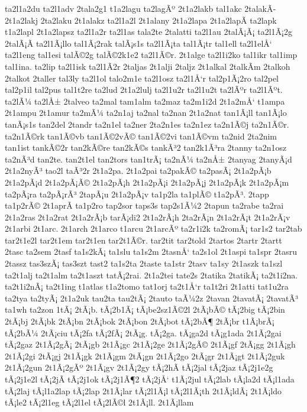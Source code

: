 {ta2l1a2du
ta2l1adv
2tala2g1
t1a2lagu
ta2lagÃº
2t1a2lakb
tal1akc
2talakÃ­
2t1a2lakj
2ta2laku
2t1alakz
ta2l1a2l
2t1alany
2t1a2lapa
2t1a2lapÃ­
ta2lapk
t1a2lapl
2t1a2lapsz
ta2l1a2r
ta2l1as
tala2te
2talatti
ta2l1au
2talÃ¡Ã¡
ta2l1Ã¡2g
2talÃ¡Ã­
ta2l1Ã¡llo
tal1Ã¡2rak
talÃ¡s1s
ta2l1Ã¡ta
tal1Ã¡tr
tal1ell
ta2l1elÅ‘
ta2l1eng
tal1esi
talÃ©2g
talÃ©2k1e2
ta2l1Ã©r.
2t1alge
ta2l1i2ko
tal1ikr
tal1imp
tal1ina.
ta2lip
ta2l1isk
ta2l1Ã­2r
2taljas
2t1alji
2taljz
2t1alkal
2talkÃ­m
2talkoh
2talkot
2taller
tal3ly
ta2l1ol
talo2m1e
ta2l1osz
ta2l1Å‘r
tal2p1Ã¡2ro
tal2pel
tal2p1il
tal2pus
tal1t2re
ta2lud
2t1a2lulj
ta2l1u2r
ta2l1u2t
ta2lÃºr
ta2l1Ãºt.
ta2lÃ¼
ta2lÅ±
2talveo
ta2mal
tam1alm
ta2maz
ta2m1i2d
2t1a2mÅ‘
t1ampa
2t1ampu
2t1amur
ta2mÃ¼
ta2n1aj
ta2nal
ta2nan
2t1a2nat
tan1Ã¡ll
tan1Ã¡lo
tanÃ¡s1s
tan2del
2tandr
ta2n1el
ta2ner
2ta2n1es
ta2n1ez
ta2n1Ã©j
ta2n1Ã©r.
ta2n1Ã©rk
tan1Ã©vb
tan1Ã©2vÃ©
tan1Ã©2vi
tan1Ã©vm
ta2nid
2ta2nim
tan1ist
tankÃ©2r
tan2kÃ©re
tan2kÃ©s
tankÃ³2
tan2k1Ã³ra
2tanny
ta2n1osz
ta2nÃ³d
tan2te.
tan2t1el
tan2tors
tan1trÃ¡
ta2nÃ¼
ta2nÅ±
2tanyag
2tanyÃ¡d
2t1a2nyÃ³
tao2l
taÃ³2r
2t1a2pa.
2t1a2pai
ta2pakÃ©
ta2pasÃ¡
2t1a2pÃ¡b
2t1a2pÃ¡d
2t1a2pÃ¡Ã©
2t1a2pÃ¡h
2t1a2pÃ¡i
2t1a2pÃ¡j
2t1a2pÃ¡k
2t1a2pÃ¡m
ta2pÃ¡ra
ta2pÃ¡rÃ³
2tapÃ¡u
2t1a2pÃ¡v
ta1p2la
ta1plÃ©
t1a2pÃ³.
2tapp
ta1p2rÃ©
2t1aprÃ­
ta1p2ro
tap2sor
taps3s
tap2s1Ã¼2
2tapun
ta2rabe
ta2rai
2t1a2ras
2t1a2rat
2t1a2rÃ¡b
tarÃ¡di2
2t1a2rÃ¡h
2ta2rÃ¡n
2t1a2rÃ¡t
2t1a2rÃ¡v
2t1arbi
2t1arc.
2t1arch
2t1arco
t1arcu
2t1arcÃº
ta2r1i2k
ta2romÃ¡
tar1s2
tar2tab
tar2t1e2l
tar2t1em
tar2t1en
tar2t1Ã©r.
tar2tit
tar2told
2tartos
2tartr
2tartt
2tasc
ta2sem
2tasf
ta1s2kÃ¡
ta1slu
ta1s2m
2tasnÅ‘
ta2s1ol
2t1aspi
ta1spr
2tasru
2tassz
tas3szÃ¡
tas3szt
tast2
ta1s2ta
2taste
ta1str
2tasv
ta1sy
2t1aszk
ta1szl
ta2t1alj
ta2t1alm
ta2t1aszt
tatÃ¡2rai.
2t1a2tei
tate2s
2tatika
2tatikÃ¡
ta2t1i2na.
ta2t1i2nÃ¡
ta2t1ing
t1atlas
t1a2tomo
tat1orj
ta2t1Å‘r
ta1t2ri
2t1atti
tat1u2ra
ta2tya
ta2tyÃ¡
2t1a2uk
tau2ta
tau2tÃ¡
2tauto
taÃ¼2z
2tavan
2tavatÃ¡
2tavatÃ³
ta1wh
ta2zon
1tÃ¡
2tÃ¡b.
tÃ¡2b1Ã¡
tÃ¡be2sz1Ã©2l
2tÃ¡bÃ©
tÃ¡2big
tÃ¡2bin
2tÃ¡bj
2tÃ¡bk
2tÃ¡bn
2tÃ¡bok
2tÃ¡bon
2tÃ¡bot
tÃ¡2bÃ¶
2tÃ¡br
t1Ã¡brÃ¡
tÃ¡2bÃ¼
2tÃ¡ciu
tÃ¡2fa
tÃ¡2fÃ¡
2tÃ¡g.
tÃ¡2ga.
tÃ¡ga2d
tÃ¡g1ada
2t1Ã¡2gai
tÃ¡2gaz
2t1Ã¡2gÃ¡
2tÃ¡gb
2t1Ã¡gc
2t1Ã¡2ge
2t1Ã¡2gÃ©
2t1Ã¡gf
2tÃ¡gg
2t1Ã¡gh
2t1Ã¡2gi
2tÃ¡gj
2t1Ã¡gk
2t1Ã¡gm
2tÃ¡gn
2t1Ã¡2go
2tÃ¡gr
2t1Ã¡gt
2t1Ã¡2guk
2t1Ã¡2gun
2t1Ã¡2gÃº
2t1Ã¡gv
2t1Ã¡2gy
tÃ¡2hÃ­
tÃ¡2jal
tÃ¡2jaz
tÃ¡2j1e2g
tÃ¡2j1e2l
tÃ¡2jÃ­
tÃ¡2j1ok
tÃ¡2j1Ã¶2
tÃ¡2jÅ‘
t1Ã¡2jul
tÃ¡2lab
tÃ¡la2d
tÃ¡l1ada
tÃ¡2laj
tÃ¡l1a2lap
tÃ¡2lap
2t1Ã¡lar
tÃ¡2l1Ã¡l
tÃ¡2l1Ã¡th
2t1Ã¡ldÃ¡
2t1Ã¡ldo
tÃ¡le2
tÃ¡2l1eg
tÃ¡2l1el
tÃ¡2lÃ©l
2t1Ã¡ll.
2t1Ã¡llam
}
